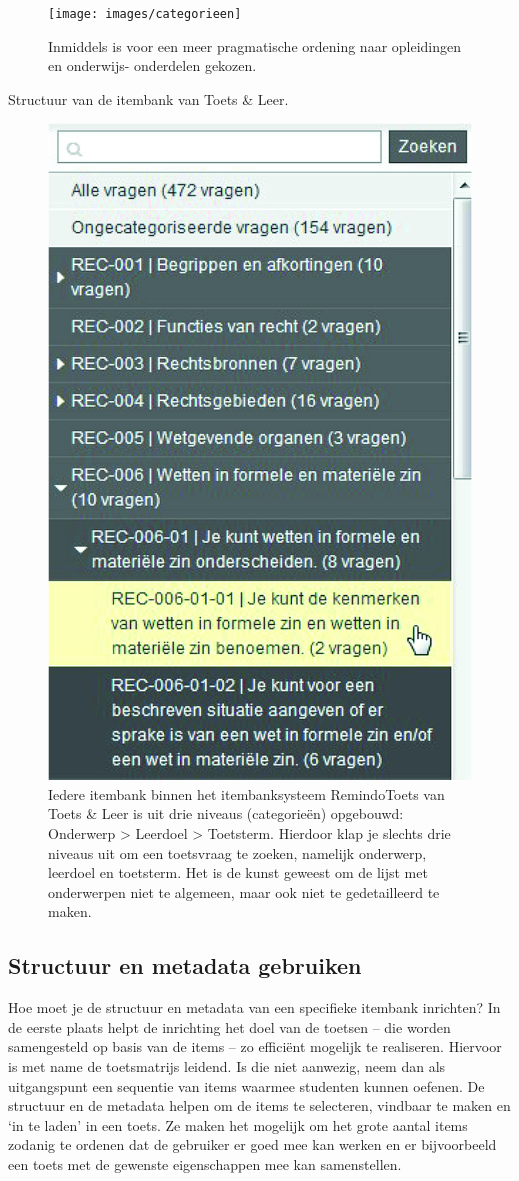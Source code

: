 \documentclass[
]{book}
\begin{document}
\begin{figure}[left]
\texttt{[image: images/categorieen]} \caption{Inmiddels is voor een meer pragmatische ordening naar opleidingen en onderwijs- onderdelen gekozen.}\label{fig:unnamed-chunk-7}
\end{figure}

Structuur van de itembank van Toets \& Leer.

\begin{figure}[left]
\includegraphics[width=0.3\linewidth]{images/vragen} \caption{Iedere itembank binnen het itembanksysteem RemindoToets van Toets & Leer is uit drie niveaus (categorieën) opgebouwd: Onderwerp > Leerdoel > Toetsterm. Hierdoor klap je slechts drie niveaus uit om een toetsvraag te zoeken, namelijk onderwerp, leerdoel en toetsterm. Het is de kunst geweest om de lijst met onderwerpen niet te algemeen, maar ook niet te gedetailleerd te maken.}\label{fig:unnamed-chunk-8}
\end{figure}

\hypertarget{structuur-en-metadata-gebruiken}{%
\subsection{Structuur en metadata gebruiken}\label{structuur-en-metadata-gebruiken}}

Hoe moet je de structuur en metadata van een specifieke itembank inrichten? In de eerste plaats helpt de inrichting het doel van de toetsen -- die worden samengesteld op basis van de items -- zo efficiënt mogelijk te realiseren. Hiervoor is met name de toetsmatrijs leidend. Is die niet aanwezig, neem dan als uitgangspunt een sequentie van items waarmee studenten kunnen oefenen. De structuur en de metadata helpen om de items te selecteren, vindbaar te maken en `in te laden' in een toets. Ze maken het mogelijk om het grote aantal items zodanig te ordenen dat de gebruiker er goed mee kan werken en er bijvoorbeeld een toets met de gewenste eigenschappen mee kan samenstellen.
\end{document}

